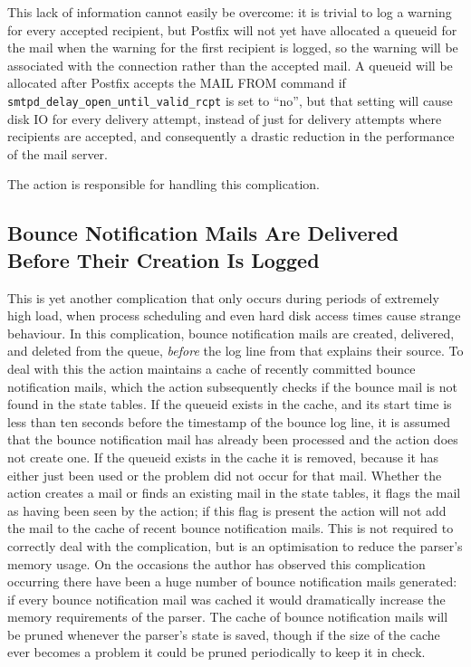 This lack of information cannot easily be overcome: it is trivial to log a
warning for every accepted recipient, but Postfix will not yet have
allocated a queueid for the mail when the warning for the first recipient
is logged, so the warning will be associated with the connection rather
than the accepted mail.  A queueid will be allocated after Postfix accepts
the MAIL FROM command if \texttt{smtpd\_delay\_open\_until\_valid\_rcpt} is
set to ``no'', but that setting will cause disk IO for every delivery
attempt, instead of just for delivery attempts where recipients are
accepted, and consequently a drastic reduction in the performance of the
mail server.

The  action is responsible for handling this complication.

\subsection{Bounce Notification Mails Are Delivered Before Their Creation
Is Logged}

\label{Bounce notification mails delivered before their creation is logged}

This is yet another complication that only occurs during periods of
extremely high load, when process scheduling and even hard disk access
times cause strange behaviour.  In this complication, bounce notification
mails are created, delivered, and deleted from the queue, \textit{before\/}
the log line from  that explains their source.  To deal with
this the  action maintains a cache of recently committed
bounce notification mails, which the  action
subsequently checks if the bounce mail is not found in the state tables.
If the queueid exists in the cache, and its start time is less than ten
seconds before the timestamp of the bounce log line, it is assumed that the
bounce notification mail has already been processed and the
 action does not create one.  If the queueid exists
in the cache it is removed, because it has either just been used or the
problem did not occur for that mail.  Whether the 
action creates a mail or finds an existing mail in the state tables, it
flags the mail as having been seen by the  action;
if this flag is present the  action will not add the mail to
the cache of recent bounce notification mails.  This is not required to
correctly deal with the complication, but is an optimisation to reduce the
parser's memory usage.  On the occasions the author has observed this
complication occurring there have been a huge number of bounce notification
mails generated: if every bounce notification mail was cached it would
dramatically increase the memory requirements of the parser.  The cache of
bounce notification mails will be pruned whenever the parser's state is
saved, though if the size of the cache ever becomes a problem it could be
pruned periodically to keep it in check.

